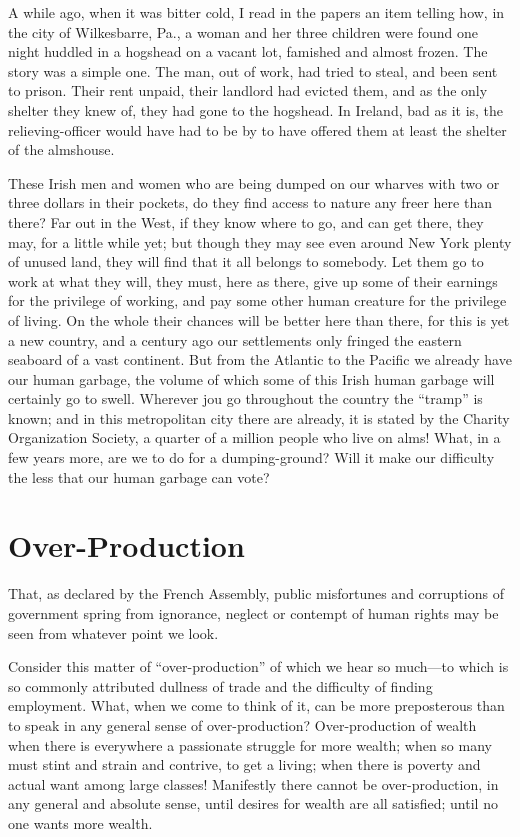 \documentclass{book}
\begin{document}
A while ago, when it was bitter cold, I read in the papers an item telling how, in the city of Wilkesbarre, Pa., a woman and her three children were found one night huddled in a hogshead on a vacant lot, famished and almost frozen. The story was a simple one. The man, out of work, had tried to steal, and been sent to prison. Their rent unpaid, their landlord had evicted them, and as the only shelter they knew of, they had gone to the hogshead. In Ireland, bad as it is, the relieving-officer would have had to be by to have offered them at least the shelter of the almshouse.

These Irish men and women who are being dumped on our wharves with two or three dollars in their pockets, do they find access to nature any freer here than there? Far out in the West, if they know where to go, and can get there, they may, for a little while yet; but though they may see even around New York plenty of unused land, they will find that it all belongs to somebody. Let them go to work at what they will, they must, here as there, give up some of their earnings for the privilege of working, and pay some other human creature for the privilege of living. On the whole their chances will be better here than there, for this is yet a new country, and a century ago our settlements only fringed the eastern seaboard of a vast continent. But from the Atlantic to the Pacific we already have our human garbage, the volume of which some of this Irish human garbage will certainly go to swell. Wherever jou go throughout the country the “tramp” is known; and in this metropolitan city there are already, it is stated by the Charity Organization Society, a quarter of a million people who live on alms! What, in a few years more, are we to do for a dumping-ground? Will it make our difficulty the less that our human garbage can vote?

\chapter{Over-Production}
\label{chapter-12}
That, as declared by the French Assembly, public misfortunes and corruptions of government spring from ignorance, neglect or contempt of human rights may be seen from whatever point we look.

Consider this matter of “over-production” of which we hear so much—to which is so commonly attributed dullness of trade and the difficulty of finding employment. What, when we come to think of it, can be more preposterous than to speak in any general sense of over-production? Over-production of wealth when there is everywhere a passionate struggle for more wealth; when so many must stint and strain and contrive, to get a living; when there is poverty and actual want among large classes! Manifestly there cannot be over-production, in any general and absolute sense, until desires for wealth are all satisfied; until no one wants more wealth.
\end{document}
